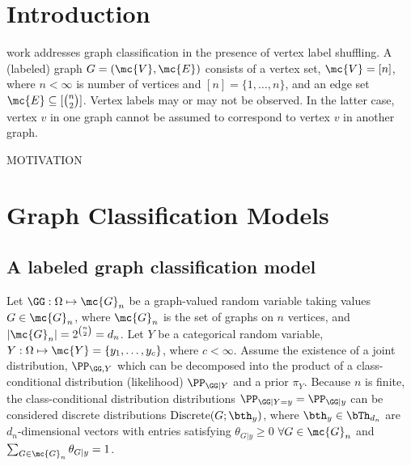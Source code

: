 \documentclass[10pt,journal,cspaper,compsoc]{IEEEtran}
\begin{document}
\maketitle
\IEEEdisplaynotcompsoctitleabstractindextext
\IEEEpeerreviewmaketitle



\section{Introduction} \label{sec:1}

 work addresses graph classification in the presence of vertex label shuffling.   
A (labeled) graph $G=(\mc{V},\mc{E})$ consists of a vertex set, $\mc{V}=[n]$, where $n < \infty$ is number of vertices and $[n]=\{1,\ldots, n\}$, and an edge set $\mc{E} \subseteq [\binom{n}{2}]$.  Vertex labels may or may not be observed.  In the latter case, vertex $v$ in one graph cannot be assumed to correspond to vertex $v$ in another graph.

MOTIVATION




\section{Graph Classification Models} %
\label{sec:shuffler_graph_class_models}

\subsection{A labeled graph classification model} %
\label{sub:a_labeled_graph_classification_model}


 Let $\GG: \Omega \mapsto \mc{G}_n$ be a graph-valued random variable taking values $G\in \mc{G}_n$, where $\mc{G}_n$ is the set of graphs on $n$ vertices, and $|\mc{G}_n|=2^{\binom{n}{2}}=d_n$. 
Let $Y$ be a categorical random variable, $Y: \Omega \mapsto \mc{Y}=\{y_1,\ldots, y_{c}\}$, where $c< \infty$.  Assume the existence of a joint distribution, $\PP_{\GG,Y}$ which can be decomposed into the product of a class-conditional distribution (likelihood) $\PP_{\GG|Y}$ and a prior $\pi_Y$. Because $n$ is finite, the class-conditional distribution distributions $\PP_{\GG | Y=y}=\PP_{\GG|y}$ can be considered discrete distributions $\text{Discrete}(G; \bth_y)$, where $\bth_y \in \bTh_{d_n}$ are $d_n$-dimensional vectors with entries satisfying $\theta_{G|y}\geq 0$ $\forall G \in \mc{G}_n$ and $\sum_{G \in \mc{G}_n} \theta_{G|y}=1$.
\end{document}
